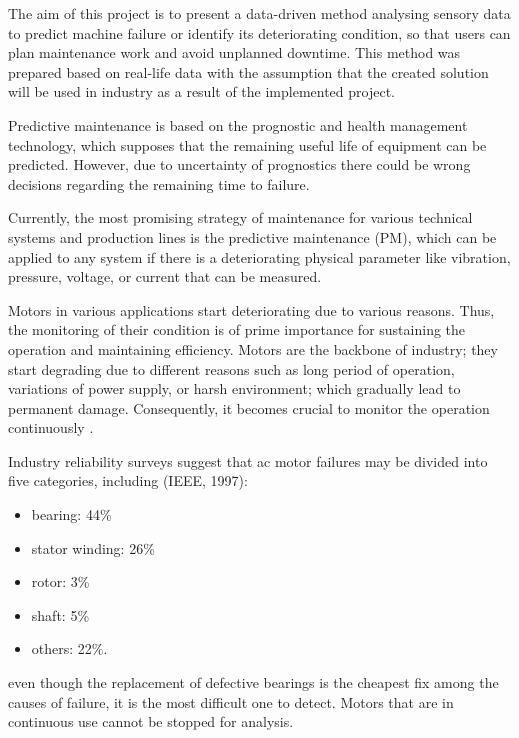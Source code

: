 The aim of this project is to present a data-driven method analysing sensory data to predict machine failure or identify its deteriorating condition, so that users can plan maintenance work and avoid unplanned downtime. This method was prepared based on real-life data with the assumption that the created solution will be used in industry as a result of the implemented project. 

Predictive maintenance is based on the prognostic and health management technology, which supposes that the remaining useful life of equipment can be predicted. However, due to uncertainty of prognostics there could be wrong decisions regarding the remaining time to failure. 

Currently, the most promising strategy of maintenance for various technical systems and production lines is the predictive maintenance (PM), which can be applied to any system if there is a deteriorating physical parameter like vibration, pressure, voltage, or current that can be measured\cite{sampaio_prediction_2019}.

Motors in various applications start deteriorating due to various reasons. Thus, the monitoring of their condition is of prime importance for sustaining the operation and maintaining efficiency. Motors are the backbone of industry; they start degrading due to different reasons such as long period of operation, variations of power supply, or harsh environment; which gradually lead to permanent damage. Consequently, it becomes crucial to monitor the operation continuously \cite{han_motor_2019}. 

Industry reliability surveys suggest that ac motor failures may be divided into five categories, including (IEEE, 1997): 

\begin{itemize}
	\item bearing: 44\% 
	
	\item stator winding: 26\% 
	
	\item rotor: 3\% 
	
	\item shaft: 5\% 
	
	\item others: 22\%. 
\end{itemize}


even though the replacement of defective bearings is the cheapest fix among the causes of failure, it is the most difficult one to detect. Motors that are in continuous use cannot be stopped for analysis. 
